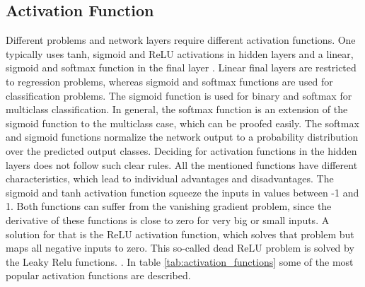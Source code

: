 \subsection{Activation Function}
Different problems and network layers require different activation functions. One typically uses tanh, sigmoid and ReLU activations in hidden layers and a linear, sigmoid and softmax function in the final layer \cite{Brownlee2021}. Linear final layers are restricted to regression problems, whereas sigmoid and softmax functions are used for classification problems. The sigmoid function is used for binary and softmax for multiclass classification. In general, the softmax function is an extension of the sigmoid function to the multiclass case, which can be proofed easily. The softmax and sigmoid functions normalize the network output to a probability distribution over the predicted output classes. Deciding for activation functions in the hidden layers does not follow such clear rules. All the mentioned functions have different characteristics, which lead to individual advantages and disadvantages. The sigmoid and tanh activation function squeeze the inputs in values between -1 and 1. Both functions can suffer from the vanishing gradient problem, since the derivative of these functions is close to zero for very big or small inputs. A solution for that is the ReLU activation function, which solves that problem but maps all negative inputs to zero. This so-called dead ReLU problem is solved by the Leaky Relu functions.  \cite{Brownlee2021}. In table \ref{tab:activation_functions} some of the most popular activation functions are described.

